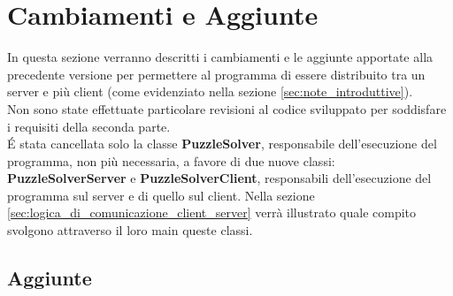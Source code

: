 % 
%
%


\section{Cambiamenti e Aggiunte} %
\label{sec:cambiamenti_e_aggiunte}
In questa sezione verranno descritti i cambiamenti e le aggiunte apportate alla precedente versione per permettere al programma di essere distribuito tra un server e più client (come evidenziato nella sezione \ref{sec:note_introduttive}). \\
Non sono state effettuate particolare revisioni al codice sviluppato per soddisfare i requisiti della seconda parte. \\
\'E stata cancellata solo la classe \textbf{PuzzleSolver}, responsabile dell'esecuzione del programma, non più necessaria, a favore di due nuove classi: \textbf{PuzzleSolverServer} e \textbf{PuzzleSolverClient}, responsabili dell'esecuzione del programma sul server e di quello sul client. Nella sezione \ref{sec:logica_di_comunicazione_client_server} verrà illustrato quale compito svolgono attraverso il loro main queste classi.

	\subsection{Aggiunte} %
	\label{sub:aggiunte}
